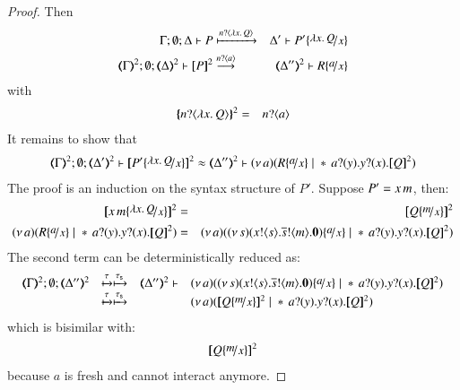 \begin{proof}
	\noi Then
%
	\begin{eqnarray*}
		\Gamma; \es; \Delta \proves P &\hby{\bactinp{n}{\abs{x}{Q}}}& \Delta' \proves P' \subst{\abs{x}{Q}}{x}\\
		\tmap{\Gamma}{2}; \es; \tmap{\Delta}{2} \proves \pmap{P}{2} &\by{\bactinp{n}{a}}& \tmap{\Delta''}{2} \proves R \subst{a}{x}
	\end{eqnarray*}
%
	\noi with
%
	\begin{eqnarray*}
		\{\!\!\{n ? \langle \lambda x.\,Q \rangle\}\!\!\}^{2} &=& n ? \langle a \rangle
	\end{eqnarray*}
%
	It remains to show that
%
	\begin{eqnarray*}
		\tmap{\Gamma}{2}; \es; \tmap{\Delta'}{2} \proves \pmap{P' \subst{\abs{x}{Q}}{x}}{2} \wb
		\tmap{\Delta''}{2} \proves \newsp{a}{R \subst{a}{x} \Par \repl{} \binp{a}{y} \binp{y}{x} \pmap{Q}{2}}
	\end{eqnarray*}
%
	\noi The proof is an induction on the syntax structure of $P'$.
	Suppose $P' = x\, {m}$, then:
%
	\begin{eqnarray*}
		\pmap{\appl{x}{m} \subst{\abs{x}{Q}}{x}}{2} &=& \pmap{Q \subst{m}{x}}{2}\\
		\newsp{a}{R \subst{a}{x} \Par \repl{} \binp{a}{y} \binp{y}{x} \pmap{Q}{2}} &=& \newsp{a}{\newsp{s}{ \bout{x}{s} \bout{\dual{s}}{m} \inact} \subst{a}{x} \Par \repl{} \binp{a}{y} \binp{y}{x} \pmap{Q}{2}}
	\end{eqnarray*}
%
	\noi The second term can be deterministically reduced as:
%
	\begin{eqnarray*}
		\mhorel{\tmap{\Gamma}{2}}{\tmap{\Delta''}{2}}{\newsp{a}{\newsp{s}{ \bout{x}{s} \bout{\dual{s}}{m} \inact} \subst{a}{x} \Par \repl{} \binp{a}{y} \binp{y}{x} \pmap{Q}{2}}}
		{\hby{\tau} \hby{\stau}}
		{\tmap{\Delta''}{2}}{}{\newsp{a}{\pmap{Q \subst{m}{x}}{2} \Par \repl{} \binp{a}{y} \binp{y}{x} \pmap{Q}{2}}}
	\end{eqnarray*}
%
	\noi which is bisimilar with:
%
	\begin{eqnarray*}
		\pmap{Q \subst{m}{x}}{2}
	\end{eqnarray*}
%
	\noi because $a$ is fresh and cannot interact anymore.


\end{proof}
